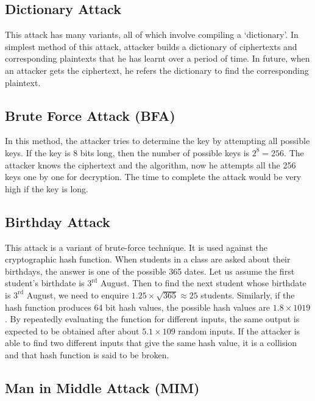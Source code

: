 \documentclass[british]{report}
\begin{document}
\subsection{Dictionary Attack}

This attack has many variants, all of which involve compiling a `dictionary'.
In simplest method of this attack, attacker builds a dictionary of
ciphertexts and corresponding plaintexts that he has learnt over a
period of time. In future, when an attacker gets the ciphertext, he
refers the dictionary to find the corresponding plaintext.

\subsection{Brute Force Attack (BFA)}

In this method, the attacker tries to determine the key by attempting
all possible keys. If the key is 8 bits long, then the number of possible
keys is $2^{8}=256$. The attacker knows the ciphertext and the algorithm,
now he attempts all the 256 keys one by one for decryption. The time
to complete the attack would be very high if the key is long.

\subsection{Birthday Attack}

This attack is a variant of brute-force technique. It is used against
the cryptographic hash function. When students in a class are asked
about their birthdays, the answer is one of the possible 365 dates.
Let us assume the first student's birthdate is $3^{\text{rd}}$ August.
Then to find the next student whose birthdate is $3^{\text{rd}}$
August, we need to enquire ${\displaystyle 1.25\times\sqrt{365}\approx25}$
students. Similarly, if the hash function produces 64 bit hash values,
the possible hash values are $1.8\times1019$. By repeatedly evaluating
the function for different inputs, the same output is expected to
be obtained after about $5.1\times109$ random inputs. If the attacker
is able to find two different inputs that give the same hash value,
it is a collision and that hash function is said to be broken.

\subsection{Man in Middle Attack (MIM)}
\end{document}
